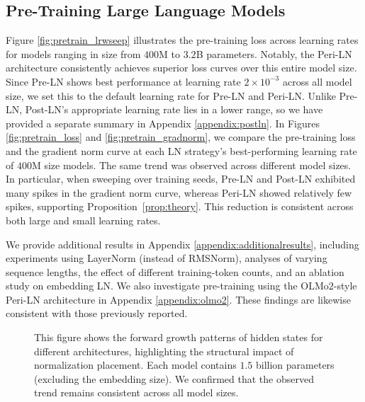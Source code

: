 \subsection{Pre-Training Large Language Models}\label{subsec:pretrain}
Figure \ref{fig:pretrain_lrwseep} illustrates the pre-training loss across learning rates for models ranging in size from $400$M to $3.2$B parameters. Notably, the Peri-LN architecture consistently achieves superior loss curves over this entire model size. Since Pre-LN shows best performance at learning rate $2 \times 10^{-3}$ across all model size, we set this to the default learning rate for Pre-LN and Peri-LN. Unlike Pre-LN, Post-LN’s appropriate learning rate lies in a lower range, so we have provided a separate summary in Appendix \ref{appendix:postln}. In Figures \ref{fig:pretrain_loss} and \ref{fig:pretrain_gradnorm}, we compare the pre-training loss and the gradient norm curve at each LN strategy’s best-performing learning rate of $400$M size models. The same trend was observed across different model sizes. In particular, when sweeping over training seeds, Pre-LN and Post-LN exhibited many spikes in the gradient norm curve, whereas Peri-LN showed relatively few spikes, supporting Proposition~\ref{prop:theory}. This reduction is consistent across both large and small learning rates. %

We provide additional results in Appendix \ref{appendix:additionalresults}, including experiments using LayerNorm (instead of RMSNorm), analyses of varying sequence lengths, the effect of different training-token counts, and an ablation study on embedding LN. We also investigate pre-training using the OLMo$2$-style Peri-LN architecture in Appendix \ref{appendix:olmo2}. These findings are likewise consistent with those previously reported.

\begin{figure*}[t]
\vskip -0.1in
    \centering
    \caption{This figure shows the forward growth patterns of hidden states for different architectures, highlighting the structural impact of normalization placement. Each model contains $1.5$ billion parameters (excluding the embedding size). We confirmed that the observed trend remains consistent across all model sizes.}
    \label{fig:growth_of_hidden_state}
\vskip -0.1in
\end{figure*}

